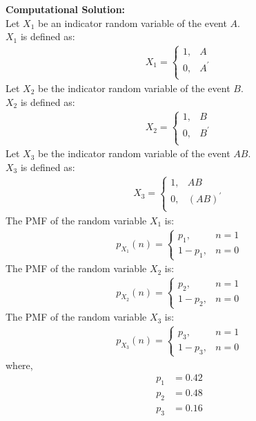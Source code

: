 \documentclass[journal]{IEEEtran}
\begin{document}
\textbf{Computational Solution:}\\
Let \(X_1\) be an indicator random variable of the event \(A\).\\
\(X_1\) is defined as:
\begin{align}
	X_1 =
	\begin{cases}
		1 ,& A\\
		0 ,& A^\prime\\
	\end{cases}
\end{align}
Let \(X_2\) be the indicator random variable of the event \(B\).\\
\(X_2\) is defined as:
\begin{align}
	X_2 =
	\begin{cases}
		1 ,& B\\
		0 ,& B^\prime\\
	\end{cases}
\end{align}
Let \(X_3\) be the indicator random variable of the event \(AB\).\\
\(X_3\) is defined as:
\begin{align}
	X_3 =
	\begin{cases}
		1 ,& AB\\
		0 ,& (AB)^\prime\\
	\end{cases}
\end{align}
The PMF of the random variable \(X_1\) is:
\begin{align}
	p_{X_1}(n) =
	\begin{cases}
		p_1 ,& n = 1\\
		1 - p_1 ,& n = 0
	\end{cases}
\end{align}
The PMF of the random variable \(X_2\) is:
\begin{align}
	p_{X_2}(n) =
	\begin{cases}
		p_2 ,& n = 1\\
		1 - p_2 ,& n = 0
	\end{cases}
\end{align}
The PMF of the random variable \(X_3\) is:
\begin{align}
	p_{X_3}(n) =
	\begin{cases}
		p_3 ,& n = 1\\
		1 - p_3 ,& n = 0
	\end{cases}
\end{align}
where,
\begin{align}
	p_1 &= 0.42\\
	p_2 &= 0.48\\
	p_3 &= 0.16\\
\end{align}
\end{document}
